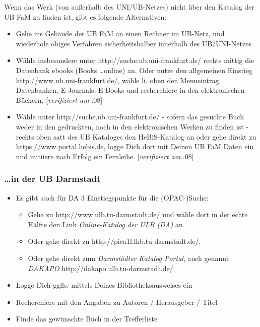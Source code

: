 \documentclass[DIV=calc,BCOR=5mm,11pt,headings=small,oneside,abstract=false, toc=bib]{scrartcl}
\begin{document}
Wenn das Werk (von außerhalb des UNI/UB-Netzes) nicht über den Katalog der
UB FaM zu finden ist, gibt es folgende Alternativen:

\begin{itemize}
  \item Gehe ins Gebäude der UB FaM an einen Rechner im UB-Netz, und wiederhole
  obiges Verfahren sicherheitshalber innerhalb des UB/UNI-Netzes. \item Wähle
  insbesondere unter {\ttfamily http://suche.ub.uni-frankfurt.de/} rechts mittig
  die Datenbank ebooks (Books \ldots online) an. Oder nutze den allgemeinen
  Einstieg {\ttfamily http://www.ub.uni-frankfurt.de/}, wähle li. oben den
  Menueintrag \glqq Datenbanken, E-Journals, E-Books\grqq{} und recherchiere in
  den elektronischen Büchern.  [\emph{verifiziert am} {.08}]
  \item Wähle unter {\ttfamily http://suche.ub.uni-frankfurt.de/} - sofern das
  gesuchte Buch weder in den gedruckten, noch in den elektronischen Werken zu
  finden ist - rechts oben satt des UB Kataloges den HeBiS-Katalog an oder gehe
  direkt zu {\ttfamily https://www.portal.hebis.de}, logge Dich dort mit Deinen
  UB FaM Daten ein und initiiere nach Erfolg ein Fernleihe.  [\emph{verifiziert
  am} {.08}]
\end{itemize}

\subsubsection{\ldots in der UB Darmstadt}

\begin{itemize}
  \item Es gibt auch für DA 3 Einstiegspunkte für die (OPAC-)Suche:
  \begin{itemize}
  \item Gehe zu {\ttfamily http://www.ulb.tu-darmstadt.de/} und wähle dort
  in der echte Hälfte den Link \emph{Online-Katalog der ULB (DA)} an.
  \item Oder gehe direkt zu {\ttfamily http://pica1l.lhb.tu-darmstadt.de/}.
  \item Oder gehe direkt zum \emph{Darmstädter Katalog Portal}, auch genannt
  \emph{DAKAPO} {\ttfamily http://dakapo.ulb.tu-darmstadt.de/}
  \end{itemize}
  \item Logge Dich ggfls. mittels Deines Bibliotheksausweises ein
  \item Recherchiere mit den Angaben zu Autoren / Herausgeber / Titel
  \item Finde das gewünschte Buch in der Trefferliste
\end{itemize}
\end{document}
